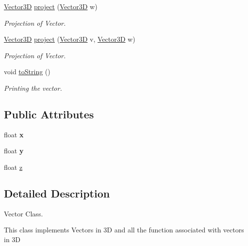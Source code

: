 \begin{DoxyCompactItemize}
\hyperlink{classVector3D}{\-Vector3\-D} \hyperlink{classVector3D_a8acd75715a111793766937ce2d7cb3a6}{project} (\hyperlink{classVector3D}{\-Vector3\-D} w)
\begin{DoxyCompactList}\small\item\em \-Projection of \-Vector. \end{DoxyCompactList}\item 
\hyperlink{classVector3D}{\-Vector3\-D} \hyperlink{classVector3D_a338a0b282e010b789e59f141eb26e55a}{project} (\hyperlink{classVector3D}{\-Vector3\-D} v, \hyperlink{classVector3D}{\-Vector3\-D} w)
\begin{DoxyCompactList}\small\item\em \-Projection of \-Vector. \end{DoxyCompactList}\item 
void \hyperlink{classVector3D_ab14daa28e2cfd4fe69441fdeac6fdac8}{to\-String} ()
\begin{DoxyCompactList}\small\item\em \-Printing the vector. \end{DoxyCompactList}\end{DoxyCompactItemize}
\subsection*{\-Public \-Attributes}
\begin{DoxyCompactItemize}
\item 
\hypertarget{classVector3D_aca5d15bdb846448e3cb73b072783f329}{float {\bfseries x}}\label{classVector3D_aca5d15bdb846448e3cb73b072783f329}

\item 
\hypertarget{classVector3D_a9b6d194fcf526d7d4f9e902421285e94}{float {\bfseries y}}\label{classVector3D_a9b6d194fcf526d7d4f9e902421285e94}

\item 
float \hyperlink{classVector3D_af9728f1eba23b9ee091755346214f391}{z}
\end{DoxyCompactItemize}


\subsection{\-Detailed \-Description}
\-Vector \-Class. 

\-This class implements \-Vectors in 3\-D and all the function associated with vectors in 3\-D 

